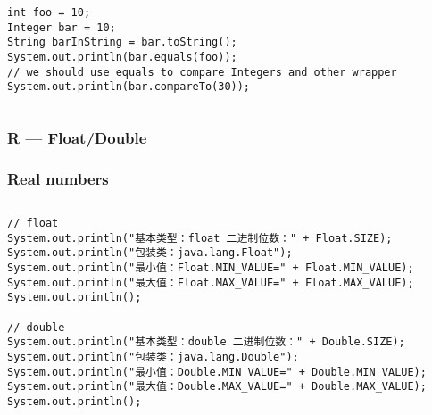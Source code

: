 \documentclass[
  11pt, %
  xcolor=dvipsnames
]{beamer}
\begin{document}
\begin{frame}[fragile]
\begin{columns}[c]
\begin{column}{0.9\textwidth}
			\begin{lstlisting}[style=Java]
int foo = 10;
Integer bar = 10;
String barInString = bar.toString();
System.out.println(bar.equals(foo));
// we should use equals to compare Integers and other wrapper
System.out.println(bar.compareTo(30));
  \end{lstlisting}

		\end{column}
	\end{columns}

\end{frame}

\subsubsection{R --- Float/Double}
\begin{frame}[fragile]
	\frametitle{Real numbers}


	\begin{columns}[c]
		\begin{column}{0.9\textwidth}

			\begin{lstlisting}[style=Java]
// float
System.out.println("基本类型：float 二进制位数：" + Float.SIZE);
System.out.println("包装类：java.lang.Float");
System.out.println("最小值：Float.MIN_VALUE=" + Float.MIN_VALUE);
System.out.println("最大值：Float.MAX_VALUE=" + Float.MAX_VALUE);
System.out.println();

// double
System.out.println("基本类型：double 二进制位数：" + Double.SIZE);
System.out.println("包装类：java.lang.Double");
System.out.println("最小值：Double.MIN_VALUE=" + Double.MIN_VALUE);
System.out.println("最大值：Double.MAX_VALUE=" + Double.MAX_VALUE);
System.out.println(); 
      \end{lstlisting}

		\end{column}
	\end{columns}

\end{frame}
\end{document}
